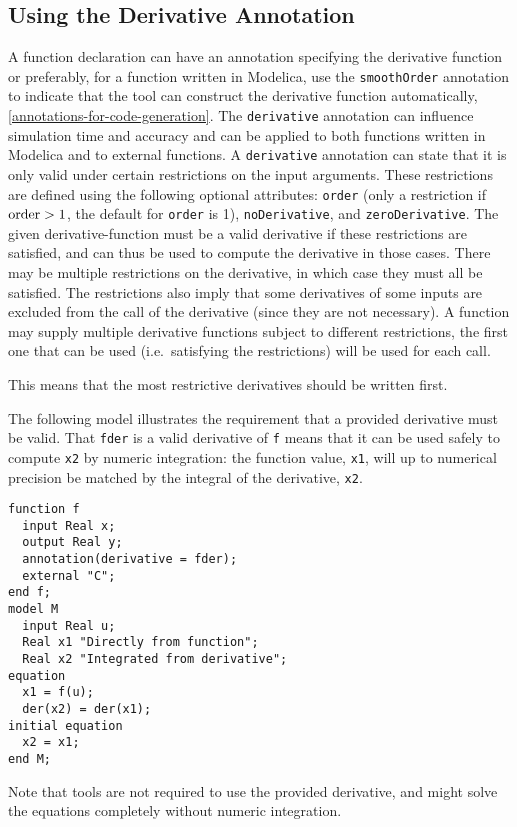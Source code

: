 \subsection{Using the Derivative Annotation}\label{using-the-derivative-annotation}

A function declaration can have an annotation  specifying the derivative function or preferably, for a function written in Modelica, use the \lstinline!smoothOrder! annotation to indicate that the tool can construct the derivative function automatically, \cref{annotations-for-code-generation}.
The \lstinline!derivative! annotation can influence simulation time and accuracy and can be applied to both functions written in Modelica and to external functions.
A \lstinline!derivative! annotation can state that it is only valid under certain restrictions on the input arguments.
These restrictions are defined using the following optional attributes: \lstinline!order! (only a restriction if $\text{\lstinline!order!} > 1$, the default for \lstinline!order! is 1), \lstinline!noDerivative!, and \lstinline!zeroDerivative!.
The given derivative-function must be a valid derivative if these restrictions are satisfied, and can thus be used to compute the derivative in those cases.
There may be multiple restrictions on the derivative, in which case they must all be satisfied. The restrictions also imply that some derivatives of some inputs are excluded from the call of the derivative (since they are not necessary).
A function may supply multiple derivative functions subject to different restrictions, the first one that can be used (i.e.\ satisfying the restrictions) will be used for each call.

\begin{nonnormative}
This means that the most restrictive derivatives should be written first.
\end{nonnormative}

\begin{example}
The following model illustrates the requirement that a provided derivative must be valid.
That \lstinline!fder! is a valid derivative of \lstinline!f! means that it can be used safely to compute \lstinline!x2! by numeric integration: the function value, \lstinline!x1!, will up to numerical precision be matched by the integral of the derivative, \lstinline!x2!.
\begin{lstlisting}[language=modelica]
function f
  input Real x;
  output Real y;
  annotation(derivative = fder);
  external "C";
end f;
model M
  input Real u;
  Real x1 "Directly from function";
  Real x2 "Integrated from derivative";
equation
  x1 = f(u);
  der(x2) = der(x1);
initial equation
  x2 = x1;
end M;
\end{lstlisting}
Note that tools are not required to use the provided derivative, and might solve the equations completely without numeric integration.
\end{example}

